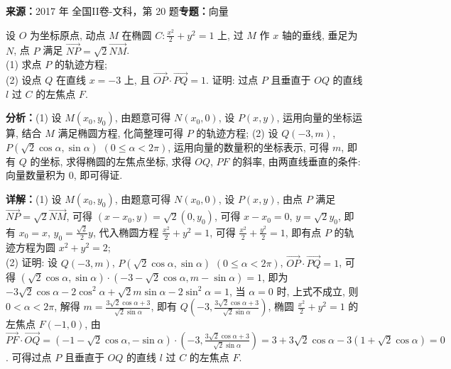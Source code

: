 \begin{question}[points=12]
\textbf{来源：}2017 年 全国II卷-文科，第 20 题\quad \textbf{专题：}向量\par
设 $O$ 为坐标原点, 动点 $M$ 在椭圆 $C: \frac{x^2}{2}+y^2=1$ 上, 过 $M$ 作 $x$ 轴的垂线, 垂足为 $N$, 点 $P$ 满足 $\overrightarrow{NP}=\sqrt{2}\overrightarrow{NM}$. \\ (1) 求点 $P$ 的轨迹方程; \\ (2) 设点 $Q$ 在直线 $x=-3$ 上, 且 $\overrightarrow{OP}\cdot\overrightarrow{PQ}=1$. 证明: 过点 $P$ 且垂直于 $OQ$ 的直线 $l$ 过 $C$ 的左焦点 $F$.
\begin{solution}

\textbf{分析：}(1) 设 $M(x_0,y_0)$, 由题意可得 $N(x_0,0)$, 设 $P(x,y)$, 运用向量的坐标运算, 结合 $M$ 满足椭圆方程, 化简整理可得 $P$ 的轨迹方程; (2) 设 $Q(-3,m)$, $P(\sqrt{2}\cos\alpha,\sin\alpha)$ $(0\le\alpha<2\pi)$, 运用向量的数量积的坐标表示, 可得 $m$, 即有 $Q$ 的坐标, 求得椭圆的左焦点坐标, 求得 $OQ$, $PF$ 的斜率, 由两直线垂直的条件: 向量数量积为 $0$, 即可得证.

\textbf{详解：}(1) 设 $M(x_0,y_0)$, 由题意可得 $N(x_0,0)$, 设 $P(x,y)$, 由点 $P$ 满足 $\overrightarrow{NP}=\sqrt{2}\overrightarrow{NM}$, 可得 $(x-x_0,y)=\sqrt{2}(0,y_0)$, 可得 $x-x_0=0$, $y=\sqrt{2}y_0$, 即有 $x_0=x$, $y_0=\frac{\sqrt{2}}{2}y$, 代入椭圆方程 $\frac{x^2}{2}+y^2=1$, 可得 $\frac{x^2}{2}+\frac{y^2}{2}=1$, 即有点 $P$ 的轨迹方程为圆 $x^2+y^2=2$; \\ (2) 证明: 设 $Q(-3,m)$, $P(\sqrt{2}\cos\alpha,\sin\alpha)$ $(0\le\alpha<2\pi)$, $\overrightarrow{OP}\cdot\overrightarrow{PQ}=1$, 可得 $(\sqrt{2}\cos\alpha,\sin\alpha)\cdot(-3-\sqrt{2}\cos\alpha,m-\sin\alpha)=1$, 即为 $-3\sqrt{2}\cos\alpha-2\cos^2\alpha+\sqrt{2}m\sin\alpha-2\sin^2\alpha=1$, 当 $\alpha=0$ 时, 上式不成立, 则 $0<\alpha<2\pi$, 解得 $m=\frac{3\sqrt{2}\cos\alpha+3}{\sqrt{2}\sin\alpha}$, 即有 $Q\left(-3,\frac{3\sqrt{2}\cos\alpha+3}{\sqrt{2}\sin\alpha}\right)$, 椭圆 $\frac{x^2}{2}+y^2=1$ 的左焦点 $F(-1,0)$, 由 $\overrightarrow{PF}\cdot\overrightarrow{OQ}=(-1-\sqrt{2}\cos\alpha,-\sin\alpha)\cdot\left(-3,\frac{3\sqrt{2}\cos\alpha+3}{\sqrt{2}\sin\alpha}\right)=3+3\sqrt{2}\cos\alpha-3(1+\sqrt{2}\cos\alpha)=0$. 可得过点 $P$ 且垂直于 $OQ$ 的直线 $l$ 过 $C$ 的左焦点 $F$.
\end{solution}
\end{question}


